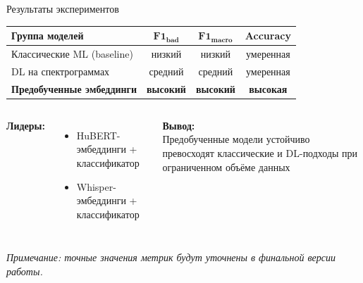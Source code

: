 \documentclass[aspectratio=169]{beamer}
\begin{document}
\begin{frame}{Результаты экспериментов}
  \begin{center}
    \begin{tabular}{lccc}
      \toprule
      \textbf{Группа моделей} & $\mathbf{F1_{\text{bad}}}$ & $\mathbf{F1_{\text{macro}}}$ & \textbf{Accuracy} \\
      \midrule
      Классические ML (baseline) & низкий & низкий & умеренная \\
      DL на спектрограммах       & средний & средний & умеренная \\
      \textbf{Предобученные эмбеддинги} & \textbf{высокий} & \textbf{высокий} & \textbf{высокая} \\
      \bottomrule
    \end{tabular}
  \end{center}
  \vspace{0.8em}
  \begin{columns}[T]
      \textbf{Лидеры:}
      \begin{itemize}
        \item HuBERT-эмбеддинги + классификатор
        \item Whisper-эмбеддинги + классификатор
      \end{itemize}
      \textbf{Вывод:}\\
      Предобученные модели устойчиво превосходят классические и DL-подходы при ограниченном объёме данных
  \end{columns}
  \vspace{0.5em}
  \small\textit{Примечание: точные значения метрик будут уточнены в финальной версии работы.}
\end{frame}
\end{document}
